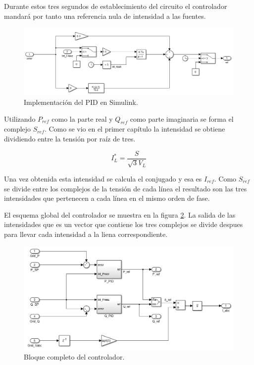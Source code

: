 \documentclass{book}
\begin{document}
Durante estos tres segundos de establecimiento del circuito el controlador mandar\'a por tanto una referencia nula de intensidad a las fuentes. \par  

\begin{figure}[h!]
\centering
\includegraphics[width=1\textwidth]{PID_PQ.PNG}
\caption{Implementaci\'on del PID en Simulink. }
\label{PID_PQ}
\end{figure} \par

Utilizando $P_{ref}$  como la parte real y $Q_{ref}$ como parte imaginaria se forma el complejo $S_{ref}$. Como se vio en el primer cap\'itulo la intensidad se obtiene dividiendo entre la tensi\'on por ra\'iz de tres. 

\begin{equation}
	I_L^*= \frac{S}{\sqrt{3}V_L}
\end{equation}

Una vez obtenida esta intensidad se calcula el conjugado y esa es $I_{ref}$. Como $S_{ref}$ se divide entre los complejos de la tensi\'on de cada l\'inea el resultado son las tres intensidades que pertenecen a cada l\'inea en el mismo orden de fase. \par

El esquema global del controlador se muestra en la figura \ref{PPC}. La salida de las intensidades que es un vector que contiene los tres complejos se divide despues para llevar cada intensidad a la liena correspondiente. \par

\begin{figure}[h!]
\centering
\includegraphics[width=1\textwidth]{PPC.PNG}
\caption{Bloque completo del controlador. }
\label{PPC}
\end{figure} \par
\end{document}
